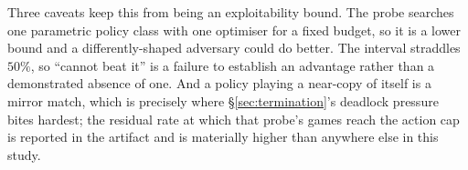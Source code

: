 Three caveats keep this from being an exploitability bound. The probe searches
one parametric policy class with one optimiser for a fixed budget, so it is a
lower bound and a differently-shaped adversary could do better. The interval
straddles $50\%$, so ``cannot beat it'' is a failure to establish an advantage
rather than a demonstrated absence of one. And a policy playing a near-copy of
itself is a mirror match, which is precisely where
\S\ref{sec:termination}'s deadlock pressure bites hardest; the residual rate at
which that probe's games reach the action cap is reported in the artifact and is
materially higher than anywhere else in this study.


